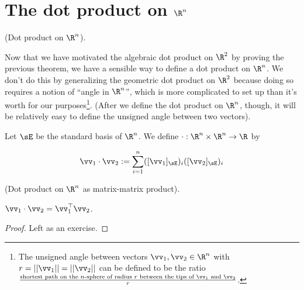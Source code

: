 \section{The dot product on $\R^n$}

\begin{defn}
    (Dot product on $\R^n$). 
    
    Now that we have motivated the algebraic dot product on $\R^2$ by proving the previous theorem, we have a sensible way to define a dot product on $\R^n$. We don't do this by generalizing the geometric dot product on $\R^2$ because doing so requires a notion of ``angle in $\R^n$'', which is more complicated to set up than it's worth for our purposes\footnote{The unsigned angle between vectors $\vv_1, \vv_2 \in \R^n$ with $r = ||\vv_1|| = ||\vv_2||$ can be defined to be the ratio $\frac{\text{shortest path on the $n$-sphere of radius $r$ between the tips of $\vv_1$ and $\vv_2$}}{r}$.}. (After we define the dot product on $\R^n$, though, it will be relatively easy to define the unsigned angle between two vectors).
    
    Let $\sE$ be the standard basis of $\R^n$. We define $\cdot:\R^n \times \R^n \rightarrow \R$ by
    
    \begin{align*}
        \vv_1 \cdot \vv_2 := \sum_{i = 1}^n ([\vv_1]_\sE)_i ([\vv_2]_\sE)_i
    \end{align*}
    
    
    
\end{defn}

\begin{theorem}
\label{ch::lin_alg::thm::dot_prod_matrix_matrix_prod}
    (Dot product on $\R^n$ as matrix-matrix product). 
    
    $\vv_1 \cdot \vv_2 = \vv_1^\top \vv_2$.
\end{theorem}

\begin{proof}
   Left as an exercise.
\end{proof}



